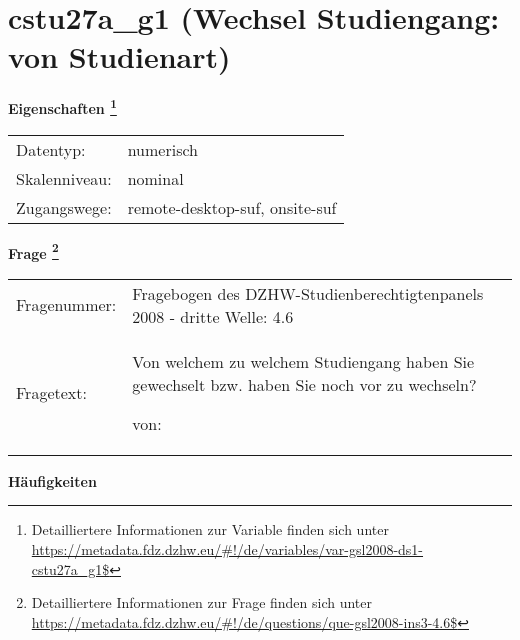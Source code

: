 
    \setcounter{footnote}{0}

    \vspace*{-1.8cm}
	\section{cstu27a\_g1 (Wechsel Studiengang: von Studienart)}
	\label{section:cstu27a_g1}



    \vspace*{0.5cm}
    \noindent\textbf{Eigenschaften
	\footnote{Detailliertere Informationen zur Variable finden sich unter
		\url{https://metadata.fdz.dzhw.eu/\#!/de/variables/var-gsl2008-ds1-cstu27a_g1$}}}\\
	\begin{tabularx}{\hsize}{@{}lX}
	Datentyp: & numerisch \\
	Skalenniveau: & nominal \\
	Zugangswege: &
	  remote-desktop-suf, 
	  onsite-suf
 \\
    \end{tabularx}



				\vspace*{0.5cm}
                \noindent\textbf{Frage
	                \footnote{Detailliertere Informationen zur Frage finden sich unter
		              \url{https://metadata.fdz.dzhw.eu/\#!/de/questions/que-gsl2008-ins3-4.6$}}}\\
				\begin{tabularx}{\hsize}{@{}lX}
					Fragenummer: &
					  Fragebogen des DZHW-Studienberechtigtenpanels 2008 - dritte Welle:
					  4.6
 \\
					Fragetext: & Von welchem zu welchem Studiengang haben Sie gewechselt bzw. haben Sie noch vor zu wechseln?\par  von: \\
				\end{tabularx}





        		\vspace*{0.5cm}
                \noindent\textbf{Häufigkeiten}

